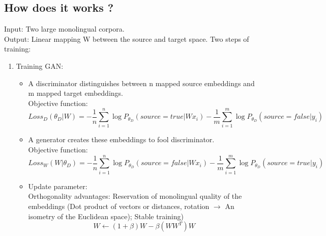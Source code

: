 \documentclass{article}
\begin{document}
\subsection{How does it works ?}
Input: Two large monolingual corpora.\\
Output: Linear mapping W between the source and target space.
Two steps of training:
\begin{enumerate}
\item Training GAN:
	\begin{itemize}
	\item A discriminator distinguishes between n mapped source embeddings and m mapped target embeddings.\\
	Objective function:
	\begin{equation}
	Loss_{D}(\theta_{D}| W) = - \frac{1}{n} \sum_{i=1}^{n} \log P_{\theta_{D}}(source=true|Wx_{i}) - \frac{1}{m} \sum_{i=1}^{m} \log P_{\theta_{D}}(source=false|y_{i})
	\end{equation}
	
	\item A generator creates these embeddings to fool discriminator.\\
	Objective function:
	\begin{equation}
	Loss_{W}(W|\theta_{D}) = - \frac{1}{n} \sum_{i=1}^{n} \log P_{\theta_{D}}(source=false|Wx_{i}) - \frac{1}{m} \sum_{i=1}^{m} \log P_{\theta_{D}}(source=true|y_{i})
	\end{equation}
	
	\item Update parameter:\\
	Orthogonality advantages: Reservation of monolingual quality of the embeddings (Dot product of vectors or distances, rotation $\rightarrow$ An isometry of the Euclidean space); Stable training)
	\begin{equation}
	W \leftarrow (1 + \beta)W - \beta(WW^{T})W
	\end{equation}
	

\end{itemize}
\end{enumerate}
\end{document}
